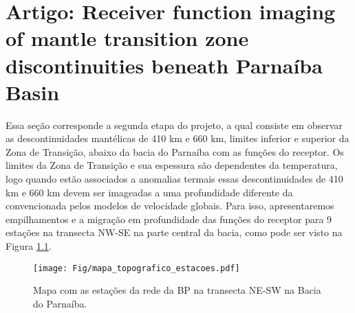 \chapter{Artigo: Receiver function imaging of mantle transition zone discontinuities beneath Parnaíba Basin}

Essa seção corresponde a segunda etapa do projeto, a qual consiste em observar as descontinuidades mantélicas de 410 km e 660 km, limites inferior e superior da Zona de Transição, abaixo da bacia do Parnaíba com as funções do receptor. Os limites da Zona de Transição e sua espessura são dependentes da temperatura, logo quando estão associados a anomalias termais essas descontinuidades de 410 km e 660 km devem ser imageadas a uma profundidade diferente da convencionada pelos modelos de velocidade globais. Para isso, apresentaremos empilhamentos e a migração em profundidade das funções do receptor para 9 estações na transecta NW-SE na parte central da bacia, como pode ser visto na Figura \ref{mapa_sta_mantle}.

\begin{figure}[!ht]
\begin{center}
\texttt{[image: Fig/mapa\_topografico\_estacoes.pdf]}
\caption{Mapa com as estações da rede da BP na transecta NE-SW na Bacia do Parnaíba.}
\label{mapa_sta_mantle}
\end{center}
\end{figure}